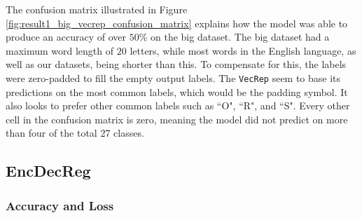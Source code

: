The confusion matrix illustrated in Figure \ref{fig:result1_big_vecrep_confusion_matrix} explains how the model was able to produce an accuracy of over \(50\%\) on the big dataset. The big dataset had a maximum word length of \(20\) letters, while most words in the English language, as well as our datasets, being shorter than this. To compensate for this, the labels were zero-padded to fill the empty output labels. The {\tt VecRep} seem to base its predictions on the most common labels, which would be the padding symbol. It also looks to prefer other common labels such as ``O", ``R", and ``S". Every other cell in the confusion matrix is zero, meaning the model did not predict on more than four of the total 27 classes.

\subsection{EncDecReg}
\subsubsection{Accuracy and Loss}

\newpage
